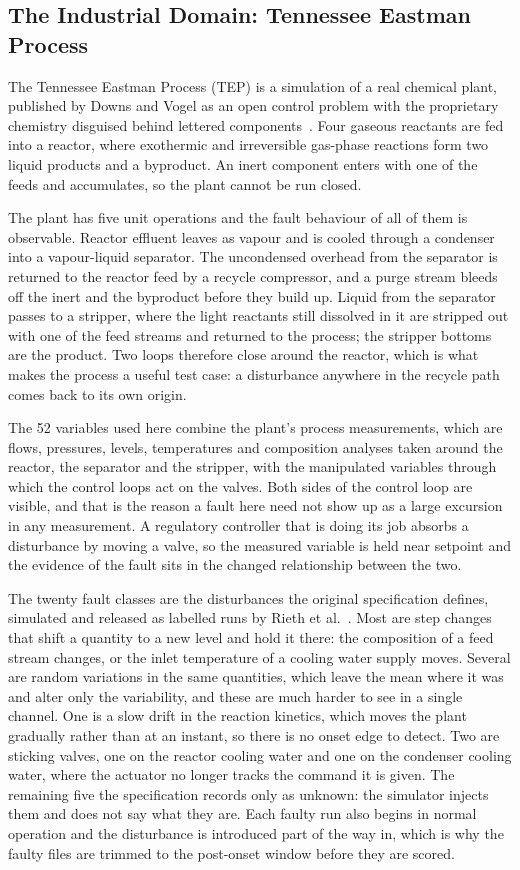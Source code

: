 \subsection{The Industrial Domain: Tennessee Eastman Process}
The Tennessee Eastman Process (TEP) is a simulation of a real chemical plant, published by Downs and Vogel as an open control problem with the proprietary chemistry disguised behind lettered components~\cite{downs1993tep}. Four gaseous reactants are fed into a reactor, where exothermic and irreversible gas-phase reactions form two liquid products and a byproduct. An inert component enters with one of the feeds and accumulates, so the plant cannot be run closed.

The plant has five unit operations and the fault behaviour of all of them is observable. Reactor effluent leaves as vapour and is cooled through a condenser into a vapour-liquid separator. The uncondensed overhead from the separator is returned to the reactor feed by a recycle compressor, and a purge stream bleeds off the inert and the byproduct before they build up. Liquid from the separator passes to a stripper, where the light reactants still dissolved in it are stripped out with one of the feed streams and returned to the process; the stripper bottoms are the product. Two loops therefore close around the reactor, which is what makes the process a useful test case: a disturbance anywhere in the recycle path comes back to its own origin.

The 52 variables used here combine the plant's process measurements, which are flows, pressures, levels, temperatures and composition analyses taken around the reactor, the separator and the stripper, with the manipulated variables through which the control loops act on the valves. Both sides of the control loop are visible, and that is the reason a fault here need not show up as a large excursion in any measurement. A regulatory controller that is doing its job absorbs a disturbance by moving a valve, so the measured variable is held near setpoint and the evidence of the fault sits in the changed relationship between the two.

The twenty fault classes are the disturbances the original specification defines, simulated and released as labelled runs by Rieth et al.~\cite{rieth2017tepdata}. Most are step changes that shift a quantity to a new level and hold it there: the composition of a feed stream changes, or the inlet temperature of a cooling water supply moves. Several are random variations in the same quantities, which leave the mean where it was and alter only the variability, and these are much harder to see in a single channel. One is a slow drift in the reaction kinetics, which moves the plant gradually rather than at an instant, so there is no onset edge to detect. Two are sticking valves, one on the reactor cooling water and one on the condenser cooling water, where the actuator no longer tracks the command it is given. The remaining five the specification records only as unknown: the simulator injects them and does not say what they are. Each faulty run also begins in normal operation and the disturbance is introduced part of the way in, which is why the faulty files are trimmed to the post-onset window before they are scored.

